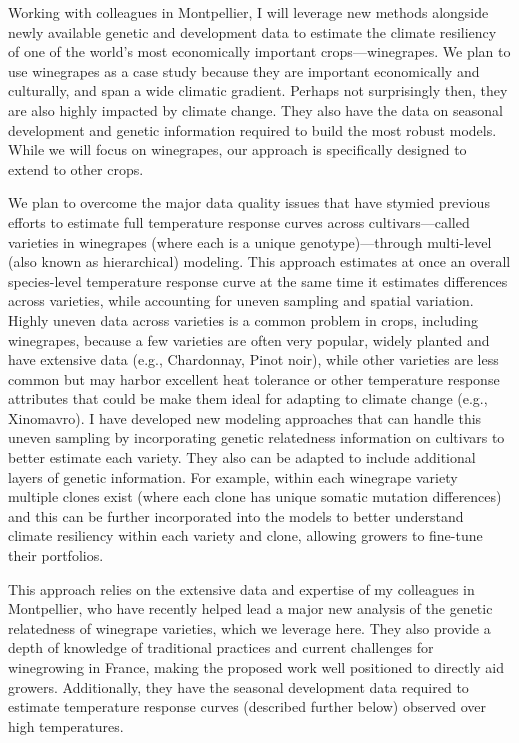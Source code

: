 \documentclass[11pt,letter,oneside]{article}
\begin{document}
Working with colleagues in Montpellier, I will leverage new methods alongside newly available genetic and development data to estimate the climate resiliency of one of the world's most economically important crops\cite{faostat}---winegrapes. We plan to use winegrapes as a case study because they are important economically and culturally, and span a wide climatic gradient.\cite{ollat2023moving} Perhaps not surprisingly then, they are also highly impacted by climate change.\cite{Leeuwen2024} They also have the data on seasonal development and genetic information required to build the most robust models. While we will focus on winegrapes, our approach is specifically designed to extend to other crops. 

We plan to overcome the major data quality issues that have stymied previous efforts to estimate full temperature response curves across cultivars---called varieties in winegrapes (where each is a unique genotype)---through multi-level (also known as hierarchical) modeling.\cite{gelmanhill,BDA} This approach estimates at once an overall species-level temperature response curve at the same time it estimates differences across varieties, while accounting for uneven sampling and spatial variation. Highly uneven data across varieties is a common problem in crops, including winegrapes, because a few varieties are often very popular, widely planted and have extensive data (e.g., Chardonnay, Pinot noir), while other varieties are less common but may harbor excellent heat tolerance or other temperature response attributes that could be make them ideal for adapting to climate change (e.g., Xinomavro).\cite{Wolkovich2017} I have developed new modeling approaches\cite{morales2024phylogenetic} that can handle this uneven sampling by incorporating genetic relatedness information on cultivars to better estimate each variety. They also can be adapted to include additional layers of genetic information. For example, within each winegrape variety multiple clones exist (where each clone has unique somatic mutation differences) and this can be further incorporated into the models to better understand climate resiliency within each variety and clone, allowing growers to fine-tune their portfolios. 

This approach relies on the extensive data and expertise of my colleagues in Montpellier, who have recently helped lead a major new analysis of the genetic relatedness of winegrape varieties,\cite{dong2023} which we leverage here. They also provide a depth of knowledge of traditional practices and current challenges for winegrowing in France, making the proposed work well positioned to directly aid growers. Additionally, they have the seasonal development data required to estimate temperature response curves (described further below) observed over high temperatures. 
\end{document}
